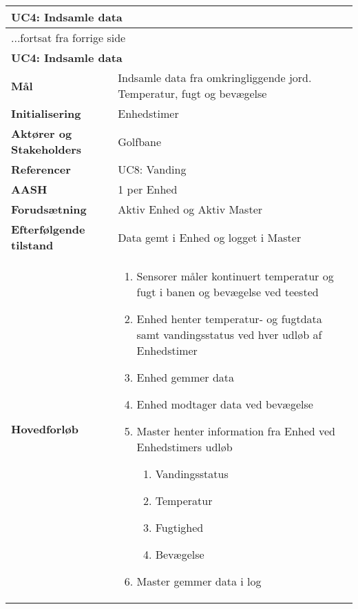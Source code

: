 \begin{center} \centering \label{UC4}
	\begin{longtable}{|p{5cm}|p{9cm}|}  %
	\hline
		\multicolumn{2}{|l|}{\textbf{UC4: Indsamle data}} \\\hline %
		\endfirsthead
		
		\multicolumn{2}{l}{...fortsat fra forrige side} \\ \hline %
		\multicolumn{2}{|l|}{\textbf{UC4: Indsamle data}} \\\hline %
		\endhead	
		
		\textbf{Mål}								&Indsamle data fra omkringliggende jord. Temperatur, fugt og bevægelse			\\\hline
		\textbf{Initialisering}					&Enhedstimer			\\\hline
		\textbf{Aktører og Stakeholders}			&Golfbane			\\\hline
		\textbf{Referencer}						&UC8: Vanding		\\\hline
		\textbf{AASH}							&1 per Enhed			\\\hline
		\textbf{Forudsætning}					&Aktiv Enhed og Aktiv Master			\\\hline
		\textbf{Efterfølgende tilstand}			&Data gemt i Enhed og logget i Master 	\\\hline
		\textbf{Hovedforløb}					
			&\begin{enumerate}
	
				\item Sensorer måler kontinuert temperatur og fugt i banen og bevægelse ved teested
				
				\item Enhed henter temperatur- og fugtdata samt vandingsstatus ved hver udløb af Enhedstimer
				
				\item Enhed gemmer data				
				
				\item Enhed modtager data ved bevægelse  
				
				\item Master henter information fra Enhed ved Enhedstimers udløb
				
				\begin{enumerate}
					\item Vandingsstatus
					\item Temperatur
					\item Fugtighed
					\item Bevægelse
				\end{enumerate}
				
				\item Master gemmer data i log
				
			\end{enumerate}\\\hline
	\end{longtable}
\end{center}

